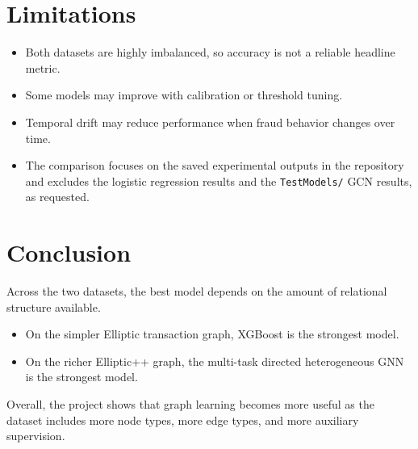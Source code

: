 \documentclass[11pt,a4paper]{article}
\begin{document}
\section{Limitations}
\begin{itemize}[noitemsep]
    \item Both datasets are highly imbalanced, so accuracy is not a reliable headline metric.
    \item Some models may improve with calibration or threshold tuning.
    \item Temporal drift may reduce performance when fraud behavior changes over time.
    \item The comparison focuses on the saved experimental outputs in the repository and excludes the logistic regression results and the \texttt{TestModels/} GCN results, as requested.
\end{itemize}

\section{Conclusion}
Across the two datasets, the best model depends on the amount of relational structure available.

\begin{itemize}[noitemsep]
    \item On the simpler Elliptic transaction graph, XGBoost is the strongest model.
    \item On the richer Elliptic++ graph, the multi-task directed heterogeneous GNN is the strongest model.
\end{itemize}

Overall, the project shows that graph learning becomes more useful as the dataset includes more node types, more edge types, and more auxiliary supervision.
\end{document}

